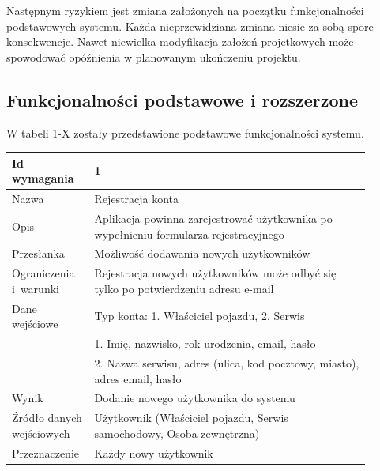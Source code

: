 \documentclass[12pt]{article}
\begin{document}
Następnym ryzykiem jest zmiana założonych na początku funkcjonalności podstawowych systemu. Każda nieprzewidziana zmiana niesie za sobą spore konsekwencje. Nawet niewielka modyfikacja założeń projetkowych może spowodować opóźnienia w planowanym ukończeniu projektu.

\subsection{Funkcjonalności podstawowe i rozszerzone}

W tabeli 1-X zostały przedstawione podstawowe funkcjonalności systemu.

\begin{table}[H]
\begin{center}
	\begin{tabular}{|p{0.18\linewidth}|p{0.72\linewidth}|}%
	\hline
	Id wymagania 	& 1 				\\ \hline
	Nazwa			& Rejestracja konta \\ \hline
	Opis & Aplikacja powinna zarejestrować użytkownika po wypełnieniu
formularza rejestracyjnego\\ \hline
	Przesłanka & Możliwość dodawania nowych użytkowników  \\ \hline
	Ograniczenia i~warunki & Rejestracja nowych użytkowników może odbyć się tylko po potwierdzeniu adresu e-mail  \\ \hline
	Dane wejściowe & Typ konta: 1. Właściciel pojazdu, 2. Serwis \\
	&  1. Imię, nazwisko, rok urodzenia, email, hasło \\
	& 2. Nazwa serwisu, adres (ulica, kod pocztowy, miasto), adres email, hasło  \\ \hline
	Wynik & Dodanie nowego użytkownika do systemu \\ \hline
	Źródło danych wejściowych & Użytkownik (Właściciel pojazdu, Serwis samochodowy, Osoba zewnętrzna) \\ \hline
	Przeznaczenie & Każdy nowy użytkownik \\ \hline
	\end{tabular}

\end{center}
\end{table}
\end{document}
